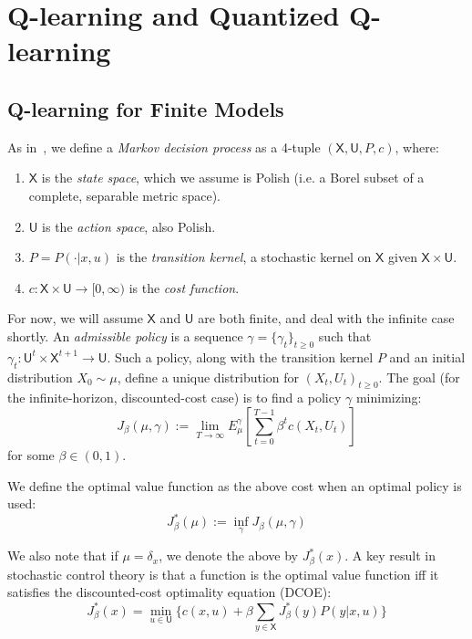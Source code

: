 \documentclass[conference, draftcls, onecolumn]{IEEEtran}
\begin{document}
\section{Q-learning and Quantized Q-learning}\label{section:Q-learning}

\subsection{Q-learning for Finite Models}
As in~\cite[Chapter 2]{Lerma}, we define a \emph{Markov decision process} as a 4-tuple \((\mathsf{X},\mathsf{U},P,c)\), where:
\begin{enumerate}
    \item \(\mathsf{X}\) is the \emph{state space}, which we assume is Polish (i.e. a Borel subset of a complete, separable metric space).
    \item \(\mathsf{U}\) is the \emph{action space}, also Polish.
    \item \(P = P(\cdot|x,u)\) is the \emph{transition kernel}, a stochastic kernel on \(\mathsf{X}\) given \(\mathsf{X} \times \mathsf{U}\).
    \item \(c : \mathsf{X} \times \mathsf{U} \to [0,\infty)\) is the \emph{cost function}.
\end{enumerate}

For now, we will assume \(\mathsf{X}\) and \(\mathsf{U}\) are both finite, and deal with the infinite case shortly. An \emph{admissible policy} is a sequence \(\gamma = \{\gamma_t\}_{t\ge0}\) such that \(\gamma_t : \mathsf{U}^t \times \mathsf{X}^{t+1} \to \mathsf{U}\). Such a policy, along with the transition kernel \(P\) and an initial distribution \(X_0 \sim \mu\), define a unique distribution for \((X_t,U_t)_{t\ge0}\). The goal (for the infinite-horizon, discounted-cost case) is to find a policy \(\gamma\) minimizing:
\[J_\beta(\mu,\gamma) := \lim_{T\to\infty}E^\gamma_\mu\left[\sum_{t=0}^{T-1}\beta^t c(X_t,U_t) \right]\]
for some \(\beta \in (0,1)\).

We define the optimal value function as the above cost when an optimal policy is used:
\[J_\beta^*(\mu) := \inf_{\gamma}J_\beta(\mu,\gamma)\]

We also note that if \(\mu = \delta_x\), we denote the above by \(J_\beta^*(x)\). A key result in stochastic control theory is that a function is the optimal value function iff it satisfies the discounted-cost optimality equation (DCOE):
\begin{equation} J_\beta^*(x) = \min_{u\in\mathsf{U}}\biggl\{ c(x,u) + \beta\sum_{y \in \mathsf{X}}J^*_\beta(y)P(y | x,u) \biggl\}\label{eq:DCOE} \end{equation}
\end{document}
